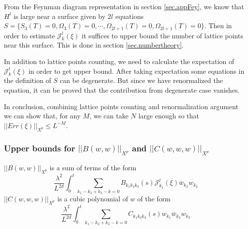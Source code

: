From the Feynman diagram representation in section \ref{sec.appFey}, we know that $H^l$ is large near a surface given by $2l$ equations $S=\{S_{3}(T)=0,\Omega_{3}(T)=0,\cdots,\Omega_{2l+1}(T)=0,\Omega_{2l+1}(T)=0\}$. Then in order to estimate $\mathcal{J}_k^l(\xi)$ it suffices to upper bound the number of lattice points near this surface. This is done in section \ref{sec.numbertheory}. 

In addition to lattice points counting, we need to calculate the expectation of $\mathcal{J}_k^l(\xi)$ in order to get upper bound. After taking expectation some equations in the definition of $S$ can be degenerate. But since we have renormalized the equation, it can be proved that the contribution from degenerate case vanishes.

In conclusion, combining lattice points counting and renormalization argument we can show that, for any $M$, we can take $N$ large enough so that $||Err(\xi)||_{X^p}\le L^{-M}$.





\subsubsection{Upper bounds for $||B(w,w)||_{X^p}$ and $||C(w,w,w)||_{X^p}$} $||B(w,w)||_{X^p}$ is a sum of terms of the form
\begin{equation}
    \frac{\lambda^2}{L^{2d}} \int^{t}_0\sum_{k_1-k_2+k_3-k=0} B_{k_1k_2k_3}(s)  \mathcal{J}^{l}_{k_1}(\xi)\bar{w}_{k_2}w_{k_3}
\end{equation}
$||C(w,w,w)||_{X^p}$ is a cubic polynomial of $w$ of the form
\begin{equation}
    \frac{\lambda^2}{L^{2d}} \int^{t}_0\sum_{k_1-k_2+k_3-k=0} C_{k_1k_2k_3}(s)  w_{k_1}\bar{w}_{k_2}w_{k_3}
\end{equation}

